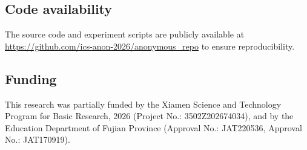 \documentclass[11pt]{article}
\begin{document}
\subsection*{Code availability}
The source code and experiment scripts are publicly available at \url{https://github.com/ics-anon-2026/anonymous_repo} to ensure reproducibility.

\subsection*{Funding}
This research was partially funded by the Xiamen Science and Technology Program for Basic Research, 2026 (Project No.: 3502Z202674034), and by the Education Department of Fujian Province (Approval No.: JAT220536, Approval No.: JAT170919).


\end{document}
